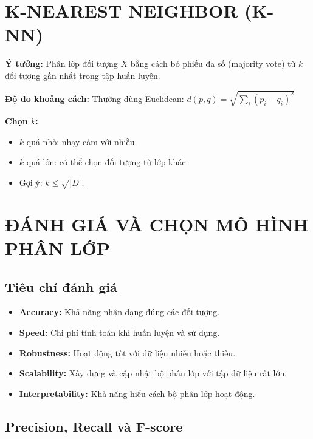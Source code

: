 \documentclass[10pt]{article}
\begin{document}
\section{K-NEAREST NEIGHBOR (K-NN)}

\textbf{Ý tưởng:} Phân lớp đối tượng $X$ bằng cách bỏ phiếu đa số (majority vote) từ $k$ đối tượng gần nhất trong tập huấn luyện.

\textbf{Độ đo khoảng cách:} Thường dùng Euclidean: $d(p, q) = \sqrt{\sum_i (p_i - q_i)^2}$

\textbf{Chọn $k$:}
\begin{itemize}
    \item $k$ quá nhỏ: nhạy cảm với nhiễu.
    \item $k$ quá lớn: có thể chọn đối tượng từ lớp khác.
    \item Gợi ý: $k \leq \sqrt{|D|}$.
\end{itemize}

\section{ĐÁNH GIÁ VÀ CHỌN MÔ HÌNH PHÂN LỚP}

\subsection{Tiêu chí đánh giá}

\begin{itemize}
    \item \textbf{Accuracy:} Khả năng nhận dạng đúng các đối tượng.
    \item \textbf{Speed:} Chi phí tính toán khi huấn luyện và sử dụng.
    \item \textbf{Robustness:} Hoạt động tốt với dữ liệu nhiễu hoặc thiếu.
    \item \textbf{Scalability:} Xây dựng và cập nhật bộ phân lớp với tập dữ liệu rất lớn.
    \item \textbf{Interpretability:} Khả năng hiểu cách bộ phân lớp hoạt động.
\end{itemize}

\subsection{Precision, Recall và F-score}
\end{document}
